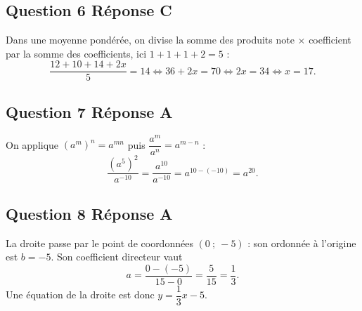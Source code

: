 \subsection*{Question 6 \quad Réponse C}

Dans une moyenne pondérée, on divise la somme des produits note $\times$ coefficient par la
somme des coefficients, ici $1 + 1 + 1 + 2 = 5$ :
\[\dfrac{12 + 10 + 14 + 2x}{5} = 14 \iff 36 + 2x = 70 \iff 2x = 34 \iff x = 17.\]

\subsection*{Question 7 \quad Réponse A}

On applique $\left(a^m\right)^n = a^{mn}$ puis $\dfrac{a^m}{a^n} = a^{m-n}$ :
\[\dfrac{\left(a^5\right)^2}{a^{-10}} = \dfrac{a^{10}}{a^{-10}} = a^{10-(-10)} = a^{20}.\]


\subsection*{Question 8 \quad Réponse A}

La droite passe par le point de coordonnées $(0~;~-5)$ : son ordonnée à l'origine est $b = -5$. Son coefficient
directeur vaut
\[a = \dfrac{0 - (-5)}{15 - 0} = \dfrac{5}{15} = \dfrac{1}{3}.\]
Une équation de la droite est donc $y = \dfrac{1}{3}x - 5$.
